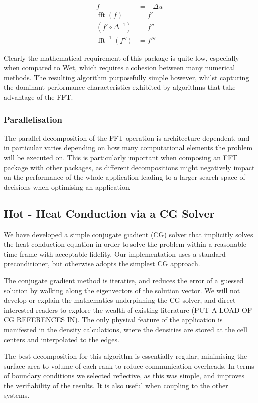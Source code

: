 \documentclass[runningheads,a4paper]{llncs}
\DeclareMathOperator{\fft}{fft}
\begin{document}
\begin{align}
  f &= -\Delta u \\
  \fft(f) &= f' \\
  (f' \circ \Delta^{-1}) &= f'' \\
  \fft^{-1}(f'') &= f'''
\end{align}

Clearly the mathematical requirement of this package is quite low, especially when compared to Wet, which requires a cohesion between many numerical methods. The resulting algorithm purposefully simple however, whilst capturing the dominant performance characteristics exhibited by algorithms that take advantage of the FFT.

\subsubsection{Parallelisation}

The parallel decomposition of the FFT operation is architecture dependent, and in particular varies depending on how many computational elements the problem will be executed on. This is particularly important when composing an FFT package with other packages, as different decompositions might negatively impact on the performance of the whole application leading to a larger search space of decisions when optimising an application.

\subsection{Hot - Heat Conduction via a CG Solver}

We have developed a simple conjugate gradient (CG) solver that implicitly solves the heat conduction equation in order to solve the problem within a reasonable time-frame with acceptable fidelity. Our implementation uses a standard preconditioner, but otherwise adopts the simplest CG approach. 

The conjugate gradient method is iterative, and reduces the error of a guessed solution by walking along the eigenvectors of the solution vector. We will not develop or explain the mathematics underpinning the CG solver, and direct interested readers to explore the wealth of existing literature \cite{} (PUT A LOAD OF CG REFERENCES IN). The only physical feature of the application is manifested in the density calculations, where the densities are stored at the cell centers and interpolated to the edges.

The best decomposition for this algorithm is essentially regular, minimising the surface area to volume of each rank to reduce communication overheads. In terms of boundary conditions we selected reflective, as this was simple, and improves the verifiability of the results. It is also useful when coupling to the other systems.
\end{document}
